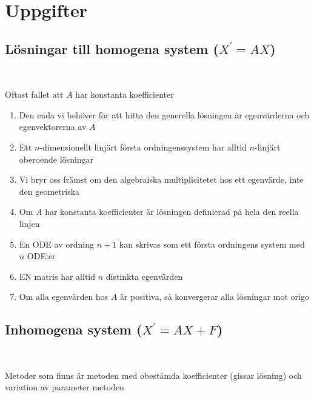 \section{Uppgifter}

\par\bigskip
\subsection{Lösningar till homogena system ($X^{\prime} = AX$)}\hfill\\
\par\bigskip
\noindent Oftast fallet att $A$ har konstanta koefficienter
\par\bigskip

\begin{enumerate}
  \item Den enda vi behöver för att hitta den generella lösningen är egenvärderna och egenvektorerna av $A$
  \item Ett $n$-dimensionellt linjärt första ordningenssystem har alltid $n$-linjärt oberoende lösningar
  \item Vi bryr oss främst om den algebraiska multiplicitetet hos ett egenvärde, inte den geometriska
  \item Om $A$ har konstanta koefficienter är lösningen definierad på hela den reella linjen
  \item En ODE av ordning $n+1$ kan skrivas som ett första ordningens system med $n$ ODE:er
  \item EN matris har alltid $n$ distinkta egenvärden
  \item Om alla egenvärden hos $A$ är positiva, så konvergerar alla lösningar mot origo
\end{enumerate}

\par\bigskip
\subsection{Inhomogena system ($X^{\prime} = AX+F$)}\hfill\\
\par\bigskip
\noindent Metoder som finns är metoden med obestämda koefficienter (gissar lösning) och variation av parameter metoden 
\par\bigskip

